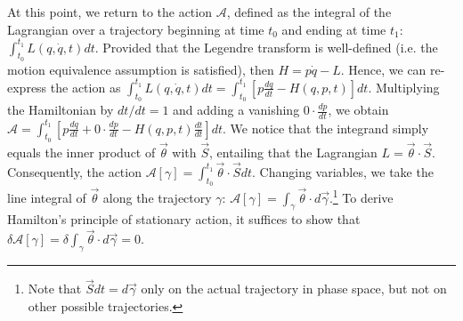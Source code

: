 \documentclass[letterpaper]{article}
\renewcommand{\vector}[1]{\ensuremath{\vec{#1}}} %
\newcommand{\integral}{\int}
\begin{document}

At this point, we return to the action $ \mathscr{A}$, defined as the integral of the Lagrangian over a trajectory beginning at time $t_0$ and ending at time $t_1$: $\integral^{t_1}_{t_0} L (q, \dot{q}, t) dt$. Provided that the Legendre transform is well-defined (i.e. the motion equivalence assumption is satisfied), then $H = p \dot{q} - L$. Hence, we can re-express the action as $\integral^{t_1}_{t_0} L (q, \dot{q}, t) dt = \integral^{t_1}_{t_0} [p \frac{dq}{dt} - H(q, p, t) ]dt$. Multiplying the Hamiltonian by $dt/dt = 1$ and adding a vanishing $0 \cdot \frac{dp}{dt}$, we obtain $ \mathscr{A} = \integral^{t_1}_{t_0} [p \frac{dq}{dt} + 0 \cdot \frac{dp}{dt} - H(q, p, t) \frac{dt}{dt} ]dt$. We notice that the integrand simply equals the inner product of $\vector{\theta}$ with $\vector{S} $, entailing that the Lagrangian $L =\vector{\theta} \cdot \vector{S} $. Consequently, the action $ \mathscr{A} [\gamma] = \integral^{t_1}_{t_0} \vector{\theta} \cdot \vector{S}  dt$. Changing variables, we take the line integral of $\vector{\theta}$ along the trajectory $\gamma $: $ \mathscr{A} [\gamma] =\integral_{\gamma} \vector{\theta} \cdot d\vector{\gamma}$.\footnote{Note that $\vector{S}  dt = d\vector{\gamma}$ only on the actual trajectory in phase space, but not on other possible trajectories.} To derive Hamilton's principle of stationary action, it suffices to show that $\delta \mathscr{A} [\gamma] =\delta \integral_{\gamma} \vector{\theta} \cdot d\vector{\gamma} = 0$. 
\end{document}
